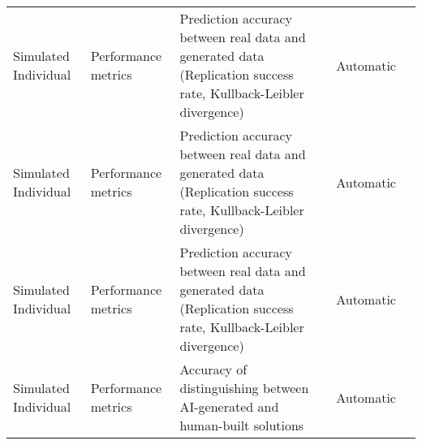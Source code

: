 \begin{small}
\begin{center}
\begin{longtable}{@{}p{}p{}p{}p{}p{}@{}}
Simulated Individual     & Performance metrics                 & Prediction accuracy between real data and generated data (Replication success rate, Kullback-Leibler divergence)                                                                                            & Automatic & \cite{tamaki_2024_chronon}                                                                                                                                                                                                                                                                                                                                                                                                  \\
Simulated Individual     & Performance metrics                 & Prediction accuracy between real data and generated data (Replication success rate, Kullback-Leibler divergence)                                                                                            & Automatic & \cite{park2024generativeagentsimulations1000}                                                                                                                                                                                                                                                                                                                                                                                                \\
Simulated Individual     & Performance metrics                 & Prediction accuracy between real data and generated data (Replication success rate, Kullback-Leibler divergence)                                                                                            & Automatic & \cite{yeykelis2024usinglargelanguagemodels}                                                                                                                                                                                                                                                                                                                                                                                             \\
Simulated Individual     & Performance metrics                 & Accuracy of distinguishing between AI-generated and human-built solutions                                                                                                                                   & Automatic & \cite{10.1145/3613905.3650860}                                                                                                                                                                                                                                                                                                                                                                               \\

\end{longtable}
\end{center}
\end{small}
